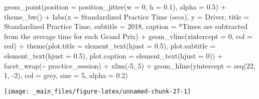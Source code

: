 \documentclass[
]{book}
\newenvironment{Shaded}{\begin{snugshade}}{\end{snugshade}}
\newcommand{\AttributeTok}[1]{\textcolor[rgb]{0.77,0.63,0.00}{#1}}
\newcommand{\DecValTok}[1]{\textcolor[rgb]{0.00,0.00,0.81}{#1}}
\newcommand{\FloatTok}[1]{\textcolor[rgb]{0.00,0.00,0.81}{#1}}
\newcommand{\FunctionTok}[1]{\textcolor[rgb]{0.00,0.00,0.00}{#1}}
\newcommand{\NormalTok}[1]{#1}
\newcommand{\SpecialCharTok}[1]{\textcolor[rgb]{0.00,0.00,0.00}{#1}}
\newcommand{\StringTok}[1]{\textcolor[rgb]{0.31,0.60,0.02}{#1}}
\begin{document}
\begin{Shaded}
\begin{Highlighting}[]
   \FunctionTok{geom\_point}\NormalTok{(}\AttributeTok{position =} \FunctionTok{position\_jitter}\NormalTok{(}\AttributeTok{w =} \DecValTok{0}\NormalTok{, }\AttributeTok{h =} \FloatTok{0.1}\NormalTok{), }\AttributeTok{alpha =} \FloatTok{0.5}\NormalTok{) }\SpecialCharTok{+}
   \FunctionTok{theme\_bw}\NormalTok{() }\SpecialCharTok{+}
   \FunctionTok{labs}\NormalTok{(}\AttributeTok{x =} \StringTok{\textquotesingle{}Standardized Practice Time (secs)\textquotesingle{}}\NormalTok{,}
        \AttributeTok{y =} \StringTok{\textquotesingle{}Driver\textquotesingle{}}\NormalTok{,}
        \AttributeTok{title =} \StringTok{\textquotesingle{}Standardized Practice Time\textquotesingle{}}\NormalTok{,}
        \AttributeTok{subtitle =} \StringTok{\textquotesingle{}2018\textquotesingle{}}\NormalTok{,}
        \AttributeTok{caption =} \StringTok{\textquotesingle{}*Times are subtracted from the average time for each Grand Prix\textquotesingle{}}\NormalTok{) }\SpecialCharTok{+}
   \FunctionTok{geom\_vline}\NormalTok{(}\AttributeTok{xintercept =} \DecValTok{0}\NormalTok{, }\AttributeTok{col =} \StringTok{\textquotesingle{}red\textquotesingle{}}\NormalTok{) }\SpecialCharTok{+}
   \FunctionTok{theme}\NormalTok{(}\AttributeTok{plot.title =} \FunctionTok{element\_text}\NormalTok{(}\AttributeTok{hjust =} \FloatTok{0.5}\NormalTok{),}
         \AttributeTok{plot.subtitle =} \FunctionTok{element\_text}\NormalTok{(}\AttributeTok{hjust =} \FloatTok{0.5}\NormalTok{),}
         \AttributeTok{plot.caption =} \FunctionTok{element\_text}\NormalTok{(}\AttributeTok{hjust =} \DecValTok{0}\NormalTok{)) }\SpecialCharTok{+}
  \FunctionTok{facet\_wrap}\NormalTok{(}\SpecialCharTok{\textasciitilde{}}\NormalTok{ practice\_session) }\SpecialCharTok{+}
  \FunctionTok{xlim}\NormalTok{(}\SpecialCharTok{{-}}\DecValTok{5}\NormalTok{, }\DecValTok{5}\NormalTok{) }\SpecialCharTok{+}
  \FunctionTok{geom\_hline}\NormalTok{(}\AttributeTok{yintercept =} \FunctionTok{seq}\NormalTok{(}\DecValTok{22}\NormalTok{, }\DecValTok{1}\NormalTok{, }\SpecialCharTok{{-}}\DecValTok{2}\NormalTok{), }\AttributeTok{col =} \StringTok{\textquotesingle{}grey\textquotesingle{}}\NormalTok{, }\AttributeTok{size =} \DecValTok{5}\NormalTok{, }\AttributeTok{alpha =}  \FloatTok{0.2}\NormalTok{)}
\end{Highlighting}
\end{Shaded}

\begin{center}\texttt{[image: \_main\_files/figure-latex/unnamed-chunk-27-1]} \end{center}
\end{document}

